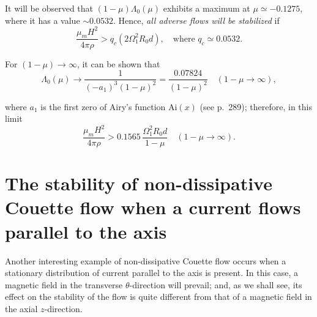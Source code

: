 It will be observed that $(1-\mu)\Lambda_0(\mu)$ exhibits a maximum at $\mu \simeq -0.1275$, where it has a value $\sim 0.0532$. Hence, \emph{all adverse flows will be stabilized} if
\begin{equation}
\frac{\mu_m H^2}{4\pi\rho} > q_c(2\Omega_1^2 R_0 d), \quad \text{where } q_c \simeq 0.0532. \label{eq:9-100}
\end{equation}

For $(1 - \mu) \to \infty$, it can be shown that
\begin{equation}
\Lambda_0(\mu) \to \frac{1}{(-a_1)^3(1-\mu)^2} = \frac{0.07824}{(1-\mu)^2} \quad (1-\mu \to \infty), \label{eq:9-101}
\end{equation}


where $a_1$ is the first zero of Airy's function $\mathrm{Ai}(x)$ (see p.~289); therefore, in this limit
\begin{equation}
\frac{\mu_m H^2}{4\pi\rho} > 0.1565\, \frac{\Omega_1^2 R_0 d}{1-\mu} \quad (1-\mu \to \infty). \label{eq:9-102}
\end{equation}

\section{The stability of non-dissipative Couette flow when a current flows parallel to the axis}
\label{sec:83}

Another interesting example of non-dissipative Couette flow occurs when a stationary distribution of current parallel to the axis is present. In this case, a magnetic field in the transverse $\theta$-direction will prevail; and, as we shall see, its effect on the stability of the flow is quite different from that of a magnetic field in the axial $z$-direction.


